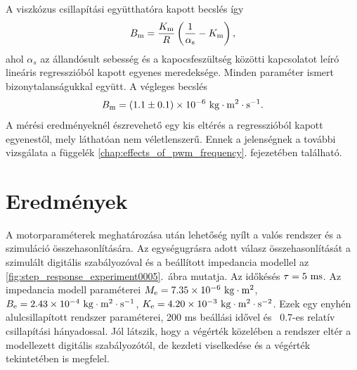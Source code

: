 A viszkózus csillapítási együtthatóra kapott becslés így
\begin{equation}
    B_{\mathrm{m}} = \frac{K_{\mathrm{m}}}{R}\left(\frac{1}{\alpha_{\mathrm{s}}} - K_{\mathrm{m}}\right),
\end{equation}
ahol \(\alpha_s\) az állandósult sebesség és a kapocsfeszültség közötti kapcsolatot 
leíró lineáris regresszióból kapott egyenes meredeksége. Minden paraméter ismert bizonytalanságukkal 
együtt. A végleges becslés
\begin{equation}
    B_{\mathrm{m}} = (1.1 \pm 0.1)\times 10^{-6}~\mathrm{kg\cdot m^2\cdot s^{-1}}.
\end{equation}
A mérési eredményeknél észrevehető egy kis eltérés a regresszióból kapott egyenestől, mely láthatóan nem 
véletlenszerű. Ennek a jelenségnek a további vizsgálata a függelék \ref{chap:effects_of_pwm_frequency}. 
fejezetében található. 

\section{Eredmények}
A motorparaméterek meghatározása után lehetőség nyílt a valós rendszer és a szimuláció összehasonlítására.
Az egységugrásra adott válasz összehasonlítását a szimulált digitális szabályozóval és a beállított impedancia modellel 
az \ref{fig:step_response_experiment0005}.~ábra mutatja. Az időkésés \(\tau = 5~\mathrm{ms}\). Az impedancia modell paraméterei 
\(M_{\mathrm{e}} = 7.35 \times 10^{-6}~\mathrm{kg \cdot m^2}\), \(B_{\mathrm{e}} = 2.43 \times 10^{-4}~\mathrm{kg \cdot m^2 \cdot s^{-1}}\),
\(K_{\mathrm{e}} = 4.20 \times 10^{-3}~\mathrm{kg \cdot m^2 \cdot s^{-2}}\). Ezek egy enyhén alulcsillapított rendszer paraméterei, 
200 ms beállási idővel és ~0.7-es relatív csillapítási hányadossal. Jól látszik, hogy a végérték közelében 
a rendszer eltér a modellezett digitális szabályozótól, de kezdeti viselkedése és a végérték tekintetében is megfelel.

